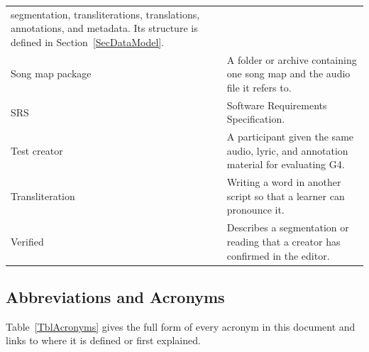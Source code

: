 \documentclass[12pt]{article}
\begin{document}
\begin{longtable}{@{}P{0.27\textwidth}P{0.68\textwidth}@{}}
segmentation, transliterations, translations, annotations, and metadata.
Its structure is defined in Section~\ref{SecDataModel}.\\
Song map package & A folder or archive containing one song map and the audio
file it refers to.\\
SRS & Software Requirements Specification.\\
Test creator & A participant given the same audio, lyric, and annotation
material for evaluating G4.\\
Transliteration & Writing a word in another script so that a learner can
pronounce it.\\
Verified & Describes a segmentation or reading that a creator has confirmed
in the editor.\\
\bottomrule
\end{longtable}

\subsection{Abbreviations and Acronyms} \label{SecAcronyms}
Table~\ref{TblAcronyms} gives the full form of every acronym in this document
and links to where it is defined or first explained.
\end{document}
